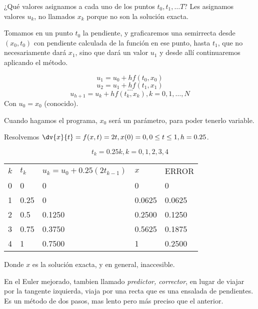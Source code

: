¿Qu\'e valores asignamos a cada uno de los puntos $t_0, t_1, \dotsc T$? Les asignamos valores $u_k$, no llamados $x_k$ porque no son la soluci\'on exacta.

Tomamos en un punto $t_0$ la pendiente, y graficaremos una semirrecta desde $(x_0,t_0)$ con pendiente calculada de la funci\'on en ese punto, hasta $t_1$, que no necesariamente dar\'a $x_1$, sino que dar\'a un valor $u_1$ y desde all\'i continuaremos aplicando el m\'etodo.



$$ u_1 = u_0 + h f(t_0,x_0)$$
$$ u_2 = u_1 + h f(t_1,x_1)$$
$$ \dotsc $$
$$ u_{h+1} = u_k + h f(t_k,x_k), k = 0,1,\dotsc, N$$
Con $u_0 = x_0$ (conocido).


Cuando hagamos el programa, $x_0$ ser\'a un par\'ametro, para poder tenerlo variable.

\begin{example}

Resolvemos $\dv{x}{t} = f(x,t) = 2t, x(0) = 0, 0\leq t \leq 1, h = 0.25$.

$$t_k = 0.25k, k = 0,1,2,3,4$$

\begin{table}[]
\begin{tabular}{lllll}
$k$ & $t_k$ & $u_k = u_0 + 0.25(2t_{k-1})$ & $x$    & ERROR  \\
0   & 0     & 0                            & 0      & 0      \\
1   & 0.25  & 0                            & 0.0625 & 0.0625 \\
2   & 0.5   & 0.1250                       & 0.2500 & 0.1250 \\
3   & 0.75  & 0.3750                       & 0.5625 & 0.1875 \\
4   & 1     & 0.7500                       & 1      & 0.2500
\end{tabular}
\end{table}

Donde $x$ es la soluci\'on exacta, y en general, inaccesible.


\end{example}

En el Euler mejorado, tambien llamado \emph{predictor, corrector}, en lugar de viajar por la tangente izquierda, viaja por una recta que es una ensalada de pendientes. Es un m\'etodo de dos pasos, mas lento pero m\'as preciso que el anterior.

